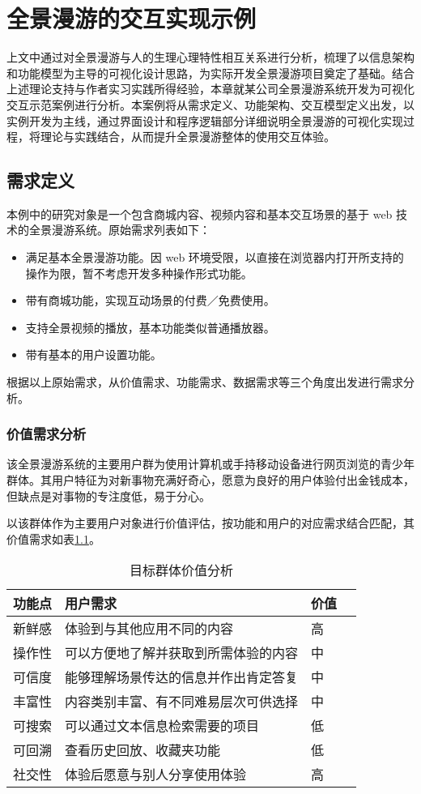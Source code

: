 \chapter{全景漫游的交互实现示例}
上文中通过对全景漫游与人的生理心理特性相互关系进行分析，梳理了以信息架构和功能模型为主导的可视化设计思路，为实际开发全景漫游项目奠定了基础。结合上述理论支持与作者实习实践所得经验，本章就某公司全景漫游系统开发为可视化交互示范案例进行分析。本案例将从需求定义、功能架构、交互模型定义出发，以实例开发为主线，通过界面设计和程序逻辑部分详细说明全景漫游的可视化实现过程，将理论与实践结合，从而提升全景漫游整体的使用交互体验。

\section{需求定义}
本例中的研究对象是一个包含商城内容、视频内容和基本交互场景的基于 web 技术的全景漫游系统。原始需求列表如下：
\begin{itemize}
	\item 满足基本全景漫游功能。因 web 环境受限，以直接在浏览器内打开所支持的操作为限，暂不考虑开发多种操作形式功能。
	\item 带有商城功能，实现互动场景的付费／免费使用。
	\item 支持全景视频的播放，基本功能类似普通播放器。
	\item 带有基本的用户设置功能。
\end{itemize}

根据以上原始需求，从价值需求、功能需求、数据需求等三个角度出发进行需求分析。

\subsection{价值需求分析}
该全景漫游系统的主要用户群为使用计算机或手持移动设备进行网页浏览的青少年群体。其用户特征为对新事物充满好奇心，愿意为良好的用户体验付出金钱成本，但缺点是对事物的专注度低，易于分心。

以该群体作为主要用户对象进行价值评估，按功能和用户的对应需求结合匹配，其价值需求如表\ref{tab:value}。

\begin{table}[htbp]
\centering
\caption{目标群体价值分析}
\vskip 5pt
\begin{tabular}{llll}
\toprule
功能点 & 用户需求 & 价值 \\
\midrule
新鲜感 & 体验到与其他应用不同的内容 & 高 \\
操作性 & 可以方便地了解并获取到所需体验的内容 & 中 \\
可信度 & 能够理解场景传达的信息并作出肯定答复 & 中 \\
丰富性 & 内容类别丰富、有不同难易层次可供选择 & 中 \\
可搜索 & 可以通过文本信息检索需要的项目 & 低 \\
可回溯 & 查看历史回放、收藏夹功能 & 低 \\
社交性 & 体验后愿意与别人分享使用体验 & 高 \\
\bottomrule
\end{tabular}
\label{tab:value}
\end{table}

